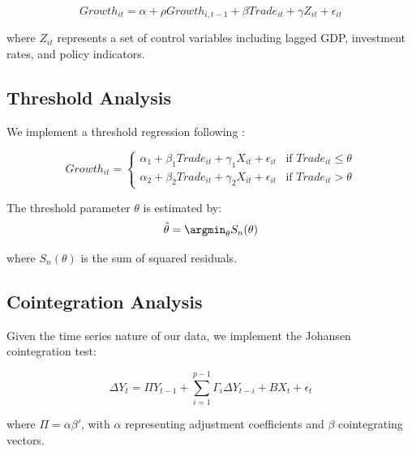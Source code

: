 \documentclass[12pt,a4paper]{article}
\theoremstyle{definition}
\begin{document}
\begin{equation}
Growth_{it} = \alpha + \rho Growth_{i,t-1} + \beta Trade_{it} + \gamma Z_{it} + \epsilon_{it}
\end{equation}

where \( Z_{it} \) represents a set of control variables including lagged GDP, investment rates, and policy indicators.

\subsection{Threshold Analysis}
We implement a threshold regression following \cite{hansen2000sample}:

\begin{equation}
Growth_{it} = \begin{cases}
\alpha_1 + \beta_1 Trade_{it} + \gamma_1 X_{it} + \epsilon_{it} & \text{if } Trade_{it} \leq \theta \\
\alpha_2 + \beta_2 Trade_{it} + \gamma_2 X_{it} + \epsilon_{it} & \text{if } Trade_{it} > \theta
\end{cases}
\end{equation}

The threshold parameter $\theta$ is estimated by:
\begin{equation}
\hat{\theta} = \argmin_{\theta} S_n(\theta)
\end{equation}

where $S_n(\theta)$ is the sum of squared residuals.

\subsection{Cointegration Analysis}
Given the time series nature of our data, we implement the Johansen cointegration test:

\begin{equation}
\Delta Y_t = \Pi Y_{t-1} + \sum_{i=1}^{p-1} \Gamma_i \Delta Y_{t-i} + BX_t + \epsilon_t
\end{equation}

where $\Pi = \alpha \beta'$, with $\alpha$ representing adjustment coefficients and $\beta$ cointegrating vectors.
\end{document}
